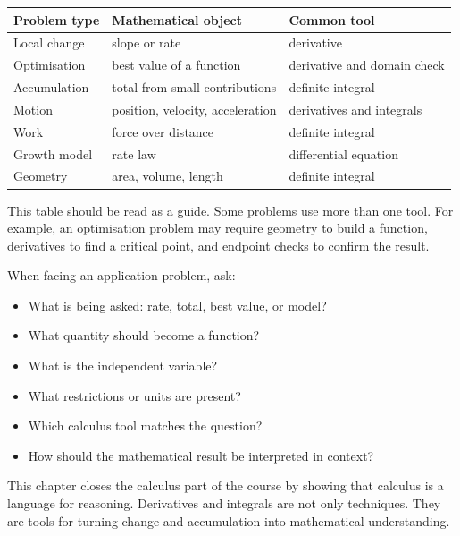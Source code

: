 \begin{center}
\begin{tabular}{lll}
\toprule
Problem type & Mathematical object & Common tool \\
\midrule
Local change & slope or rate & derivative \\
Optimisation & best value of a function & derivative and domain check \\
Accumulation & total from small contributions & definite integral \\
Motion & position, velocity, acceleration & derivatives and integrals \\
Work & force over distance & definite integral \\
Growth model & rate law & differential equation \\
Geometry & area, volume, length & definite integral \\
\bottomrule
\end{tabular}
\end{center}

This table should be read as a guide. Some problems use more than one tool. For example, an optimisation problem may require geometry to build a function, derivatives to find a critical point, and endpoint checks to confirm the result.

\begin{summarybox}
When facing an application problem, ask:
\begin{itemize}
\item What is being asked: rate, total, best value, or model?
\item What quantity should become a function?
\item What is the independent variable?
\item What restrictions or units are present?
\item Which calculus tool matches the question?
\item How should the mathematical result be interpreted in context?
\end{itemize}
\end{summarybox}

This chapter closes the calculus part of the course by showing that calculus is a language for reasoning. Derivatives and integrals are not only techniques. They are tools for turning change and accumulation into mathematical understanding.
